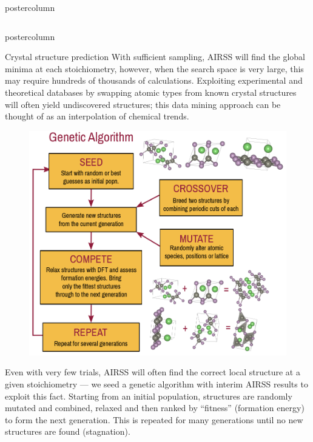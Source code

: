 \documentclass{beamer}
\begin{document}
\begin{frame}
\begin{columns}
\begin{column}{.57\textwidth}
\begin{beamercolorbox}[center]{postercolumn}
\begin{minipage}{.98\textwidth}
{\begin{columns}
\begin{column}{.48\textwidth}
\begin{beamercolorbox}[right]{postercolumn}
\begin{minipage}{\textwidth}
{\begin{myblock}{Crystal structure prediction}
              With sufficient sampling, AIRSS will find the global minima at each stoichiometry, however, when the search space is very large, this may require hundreds of thousands of calculations. Exploiting experimental and theoretical databases by swapping atomic types from known crystal structures will often yield undiscovered structures; this data mining approach can be thought of as an interpolation of chemical trends.
                \vspace{0.2in}
              \begin{figure}
                \centering
              \includegraphics[width=\textwidth]{img/ga.png}
          \end{figure}

Even with very few trials, AIRSS will often find the correct local structure at a given stoichiometry --- we seed a genetic algorithm with interim AIRSS results to exploit this fact. Starting from an initial population, structures are randomly mutated and combined, relaxed and then ranked by ``fitness'' (formation energy) to form the next generation. This is repeated for many generations until no new structures are found (stagnation).

					\end{myblock}\vfill
		}\end{minipage}\end{beamercolorbox}
	\end{column}
  \end{columns}
		}\end{minipage}\end{beamercolorbox}
  \end{column}
    

\end{columns}
\end{frame}
\end{document}
